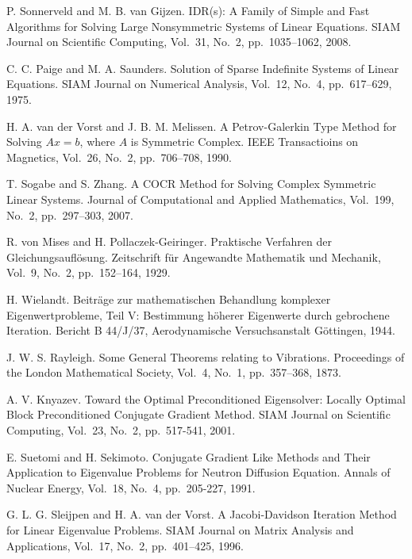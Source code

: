 \documentclass[a4paper]{jarticle}
\begin{document}
{\begin{thebibliography}{10}
P. Sonnerveld and M. B. van Gijzen.
\newblock IDR(s): A Family of Simple and Fast Algorithms for Solving Large Nonsymmetric Systems of Linear Equations.
\newblock SIAM Journal on Scientific Computing, Vol.~31, No.~2, pp.\ 1035--1062, 2008.

C. C. Paige and M. A. Saunders.
\newblock Solution of Sparse Indefinite Systems of Linear Equations.
\newblock SIAM Journal on Numerical Analysis, Vol.~12, No.~4, pp.\ 617--629, 1975.

H. A. van der Vorst and J. B. M. Melissen.
\newblock A Petrov-Galerkin Type Method for Solving $Ax=b$, where $A$ is Symmetric Complex.
\newblock IEEE Transactioins on Magnetics, Vol.~26, No.~2, pp.\ 706--708, 1990.

T. Sogabe and S. Zhang.
\newblock A COCR Method for Solving Complex Symmetric Linear Systems.
\newblock Journal of Computational and Applied Mathematics, Vol.~199, No.~2, pp.\ 297--303, 2007.

R. von Mises and H. Pollaczek-Geiringer.
\newblock Praktische Verfahren der Gleichungsaufl\"osung.
\newblock Zeitschrift f\"ur Angewandte Mathematik und Mechanik, Vol.~9, No.~2, pp.\ 152--164, 1929.

H. Wielandt.
\newblock Beitr\"age zur mathematischen Behandlung komplexer
	Eigenwertprobleme, Teil V: Bestimmung h\"oherer Eigenwerte durch
	gebrochene Iteration.
\newblock Bericht B 44/J/37, Aerodynamische Versuchsanstalt G\"ottingen, 1944.

J. W. S. Rayleigh.
\newblock Some General Theorems relating to Vibrations.
\newblock Proceedings of the London Mathematical Society, Vol.~4, No.~1,
	pp.\ 357--368, 1873.

A. V. Knyazev.
\newblock Toward the Optimal Preconditioned Eigensolver: Locally Optimal
	Block Preconditioned Conjugate Gradient Method.
\newblock SIAM Journal on Scientific Computing, Vol.~23, No.~2, pp.\ 517-541, 2001. 

E. Suetomi and H. Sekimoto.
\newblock Conjugate Gradient Like Methods and Their Application to
	Eigenvalue Problems for Neutron Diffusion Equation.
\newblock Annals of Nuclear Energy, Vol.~18, No.~4, pp.\ 205-227, 1991.

G. L. G. Sleijpen and H. A. van der Vorst.
\newblock A Jacobi-Davidson Iteration Method for Linear Eigenvalue Problems.
\newblock SIAM Journal on Matrix Analysis and Applications, Vol.~17, No.~2, pp.\ 401--425, 1996.


\end{thebibliography}}
\end{document}

